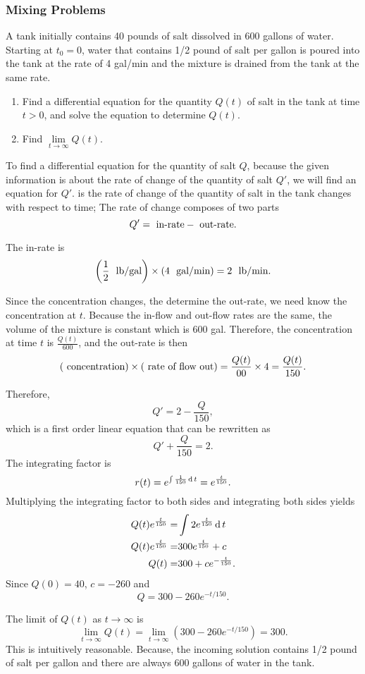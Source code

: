\subsubsection{Mixing Problems}

\begin{example}
  A tank initially contains 40 pounds of salt dissolved in 600 gallons of water. Starting at $t_0 = 0$, water that contains 1/2 pound of salt per gallon is poured into the tank at the rate of 4 gal/min and the mixture is drained from the tank at the same rate.
  \begin{enumerate}
    \item Find a differential equation for the quantity $Q(t)$ of salt in the tank at time $t > 0$, and solve the equation to determine $Q(t)$.
    \item Find $\lim\limits_{t\to\infty}Q(t)$.
  \end{enumerate}
\end{example}
\begin{solution}
To find a differential equation for the quantity of salt $Q$, because the given information is about the rate of change of the quantity of salt $Q'$, we will find an equation for $Q'$. is the rate of change of the quantity of salt in the tank changes with respect to time; The rate of change composes of two parts
\[Q' = \textup{ in-rate}-\textup{ out-rate}.\]

The in-rate is
\[\left(\frac{1}{2}\ \textup{ lb/gal}\right) \times (4\ \textup{ gal/min}) = 2\ \textup{ lb/min}.\]

Since the concentration changes, the determine the out-rate, we need know the concentration at $t$. Because the in-flow and out-flow rates are the same, the volume of the mixture is constant which is $600$ gal. Therefore, the concentration at time $t$ is $\frac{Q(t)}{600}$, and the out-rate is then
\[(\textup{ concentration})\times(\textup{ rate of flow out})=\frac{Q(t)}{00}\times 4=\frac{Q(t)}{150}.\]

Therefore,
\[Q' = 2-\frac{Q}{150},\]
which is a first order linear equation that can be rewritten as
\[Q'+\frac{Q}{150} = 2.\]
The integrating factor is
\[r(t)=e^{\int\frac{1}{150}\operatorname{d} t}=e^{\frac{t}{150}}.\]
Multiplying the integrating factor to both sides and integrating both sides yields 
\[\begin{aligned}
  Q(t)e^{\frac{t}{150}}=&\int 2e^{\frac{t}{150}}\operatorname{d} t\\
  Q(t)e^{\frac{t}{150}}=&300e^{\frac{t}{150}}+c\\
  Q(t)=&300+ce^{-\frac{t}{150}}.
\end{aligned}
\]
Since $Q(0)=40$, $c=-260$ and
\[Q=300-260e^{-t/150}.\]

The limit of $Q(t)$ as $t\to\infty$ is
\[\lim_{t \to \infty}Q(t)=\lim\limits_{t\to \infty}\left(300-260e^{-t/150}\right)=300.\]
This is intuitively reasonable. Because, the incoming solution contains 1/2 pound of salt per gallon and there are always 600 gallons of water in the tank.
\end{solution}

